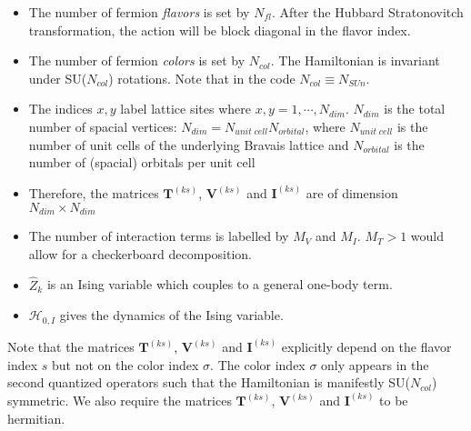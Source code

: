 \begin{itemize}
\item The number of fermion \textit{flavors} is set by $N_{fl}$.  After the Hubbard Stratonovitch transformation, the action will be block diagonal in the flavor index. 
\item The number of fermion \textit{colors} is set by $N_{col}$.    The Hamiltonian is invariant under  SU($N_{col}$)  rotations. Note that  in the code $ N_{col} \equiv N_{SUn} $. 
\item The indices $x,y$ label lattice sites where $x,y=1,\cdots, N_{dim}$. 
$N_{dim}$ is the total number of spacial vertices: $N_{dim}=N_{unit\;cell} N_{orbital}$, where $N_{unit\;cell}$ is the number of unit cells of the underlying Bravais lattice and $N_{orbital}$ is the number of (spacial) orbitals per unit cell  
\item Therefore, the  matrices $\bm{T}^{(k s)}$, $\bm{V}^{(ks)}$  and $\bm{I}^{(ks)}$ are  of dimension $N_{dim}\times N_{dim}$
\item The number of interaction terms  is labelled by $M_V$   and $M_I$.   $M_T> 1 $ would allow for a checkerboard decomposition. 
\item $\hat{Z}_k$ is an Ising variable which couples to a general one-body term. 
\item  $\mathcal{H}_{0,I}$  gives the dynamics of the Ising variable. 
\end{itemize}
Note that the matrices  $\bm{T}^{(ks)}$,  $\bm{V}^{(ks)}$ and  $\bm{I}^{(ks)}$ explicitly depend on the flavor index $s$ but not on the color index $\sigma$. 
The color index $\sigma$ only appears in  the  second quantized operators such that the Hamiltonian is manifestly SU($N_{col}$)    symmetric.  We also require
the matrices $\bm{T}^{(ks)}$,  $\bm{V}^{(ks)}$ and  $\bm{I}^{(ks)}$  to be  hermitian. 


